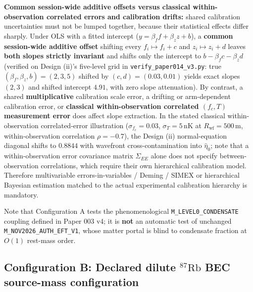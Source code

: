 \documentclass[
  american,
  11pt,
  letterpaper,
]{article}
\begin{document}
\begin{enumerate}
  \textbf{Common session-wide additive offsets versus classical within-observation correlated errors and calibration drifts:} shared calibration uncertainties must not be lumped together, because their statistical effects differ sharply. Under OLS with a fitted intercept (\(y = \beta_f f + \beta_z z + b\)), a \textbf{common session-wide additive offset} shifting every \(f_i \mapsto f_i + c\) and \(z_i \mapsto z_i + d\) leaves \textbf{both slopes strictly invariant} and shifts only the intercept to \(b - \beta_f c - \beta_z d\) (verified on Design (ii)'s five-level grid in \nolinkurl{verify_paper014_v3.py}: true \((\beta_f, \beta_z, b) = (2, 3, 5)\) shifted by \((c, d) = (0.03, 0.01)\) yields exact slopes \((2, 3)\) and shifted intercept \(4.91\), with zero slope attenuation). By contrast, a shared \textbf{multiplicative} calibration scale error, a drifting or arm-dependent calibration error, or \textbf{classical within-observation correlated \((f_c, T)\) measurement error} does affect slope extraction. In the stated classical within-observation correlated-error illustration (\(\sigma_{f_c} = 0.03\), \(\sigma_T = 5\,\mathrm{nK}\) at \(R_{\mathrm{wf}} = 500\,\mathrm{m}\), within-observation correlation \(\rho = -0.7\)), the Design (ii) normal-equation diagonal shifts to \(0.8844\) with wavefront cross-contamination into \(\hat{\eta}_0\); note that a within-observation error covariance matrix \(\Sigma_{EE}\) alone does not specify between-observation correlations, which require their own hierarchical calibration model. Therefore multivariable errors-in-variables / Deming / SIMEX or hierarchical Bayesian estimation matched to the actual experimental calibration hierarchy is mandatory.
\end{enumerate}

Note that Configuration A tests the phenomenological \nolinkurl{M_LEVEL0_CONDENSATE} coupling defined in Paper 003 v4; it is \textbf{not} an automatic test of unchanged \nolinkurl{M_NOV2026_AUTH_EFT_V1}, whose matter portal is blind to condensate fraction at \(O(1)\) rest-mass order.

\subsection{\texorpdfstring{Configuration B: Declared dilute \(^{87}\mathrm{Rb}\) BEC source-mass configuration}{Configuration B: Declared dilute \^{}\{87\}\textbackslash mathrm\{Rb\} BEC source-mass configuration}}\label{configuration-b-declared-dilute-87mathrmrb-bec-source-mass-configuration}
\end{document}
